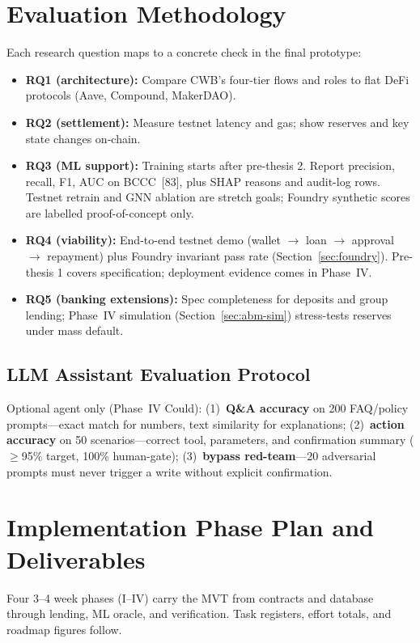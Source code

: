 \documentclass[12pt, a4paper]{report}
\begin{document}
\section{Evaluation Methodology}
\label{sec:eval-method}

Each research question maps to a concrete check in the final prototype:
\begin{itemize}[noitemsep]
\item \textbf{RQ1 (architecture):} Compare CWB's four-tier flows and roles to flat DeFi protocols (Aave, Compound, MakerDAO).
\item \textbf{RQ2 (settlement):} Measure testnet latency and gas; show reserves and key state changes on-chain.
\item \textbf{RQ3 (ML support):} Training starts after pre-thesis 2. Report precision, recall, F1, AUC on BCCC~[83], plus SHAP reasons and audit-log rows. Testnet retrain and GNN ablation are stretch goals; Foundry synthetic scores are labelled proof-of-concept only.
\item \textbf{RQ4 (viability):} End-to-end testnet demo (wallet $\to$ loan $\to$ approval $\to$ repayment) plus Foundry invariant pass rate (Section~\ref{sec:foundry}). Pre-thesis 1 covers specification; deployment evidence comes in Phase~IV.
\item \textbf{RQ5 (banking extensions):} Spec completeness for deposits and group lending; Phase~IV simulation (Section~\ref{sec:abm-sim}) stress-tests reserves under mass default.
\end{itemize}

\subsection{LLM Assistant Evaluation Protocol}
\label{sec:llm-eval}

Optional agent only (Phase~IV Could): (1)~\textbf{Q\&A accuracy} on 200 FAQ/policy prompts---exact match for numbers, text similarity for explanations; (2)~\textbf{action accuracy} on 50 scenarios---correct tool, parameters, and confirmation summary ($\geq$95\% target, 100\% human-gate); (3)~\textbf{bypass red-team}---20 adversarial prompts must never trigger a write without explicit confirmation.

\section{Implementation Phase Plan and Deliverables}

Four 3--4 week phases (I--IV) carry the MVT from contracts and database through lending, ML oracle, and verification. Task registers, effort totals, and roadmap figures follow.
\end{document}
